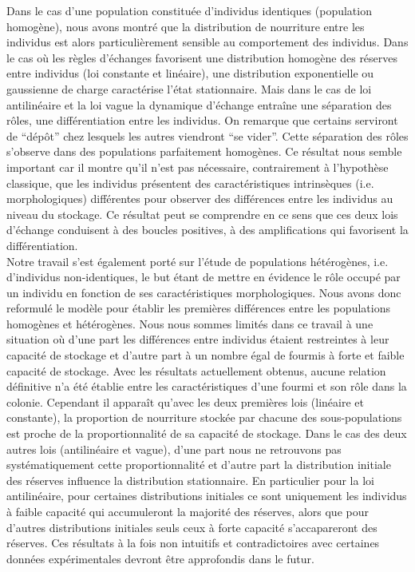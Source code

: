 Dans le cas d'une population constituée d'individus identiques (population homogène), nous avons montré que la distribution de nourriture entre les individus est alors particulièrement sensible au comportement des individus.  Dans le cas où les règles d'échanges favorisent une distribution homogène des réserves entre individus (loi constante et linéaire), une distribution exponentielle ou gaussienne de charge caractérise l'état stationnaire. Mais dans le cas de loi antilinéaire et la loi vague la dynamique d'échange entraîne une séparation des rôles, une différentiation  entre les individus. On remarque que certains serviront de ``dépôt'' chez lesquels les autres viendront ``se vider''. Cette séparation des rôles s'observe dans des populations parfaitement homogènes. Ce résultat nous semble important car il montre qu'il n'est pas nécessaire, contrairement à l'hypothèse classique, que les individus présentent des caractéristiques intrinsèques (i.e. morphologiques) différentes pour observer des différences entre les individus au niveau du stockage. Ce résultat peut se comprendre en ce sens que ces deux lois d'échange conduisent à des boucles positives, à des amplifications qui favorisent la différentiation.\\

Notre travail s'est également porté sur l'étude de populations hétérogènes, i.e. d'individus non-identiques, le but étant de mettre en évidence le rôle occupé par un individu en fonction de ses caractéristiques morphologiques. Nous avons donc reformulé le modèle pour établir les premières différences entre les populations homogènes et hétérogènes. Nous nous sommes limités dans ce travail à une situation où d'une part les différences entre individus étaient restreintes à leur capacité de stockage et d'autre part à un nombre égal de fourmis à forte et faible capacité de stockage. Avec les résultats actuellement obtenus, aucune relation définitive n'a été établie entre les caractéristiques d'une fourmi et son rôle dans la colonie. Cependant il apparaît qu'avec les deux premières lois (linéaire et constante), la proportion de nourriture stockée par chacune des sous-populations est proche de la proportionnalité de sa capacité de stockage. Dans le cas des deux autres lois (antilinéaire et vague), d'une part nous ne retrouvons pas systématiquement cette proportionnalité et d'autre part la distribution initiale des réserves influence la distribution stationnaire. En particulier pour la loi antilinéaire, pour certaines distributions initiales ce sont uniquement les individus à faible capacité qui accumuleront la majorité des réserves, alors que pour d'autres distributions initiales seuls ceux à forte capacité s'accapareront des réserves. Ces résultats à la fois non intuitifs et contradictoires avec certaines données expérimentales devront être approfondis dans le futur.\\

